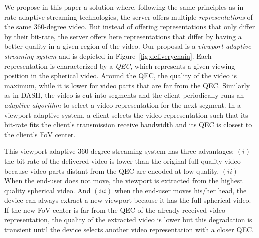 We propose in this paper a solution where, following the same principles as in
rate-adaptive streaming technologies, the server offers multiple \emph{representations}
of the same 360-degree video. But instead of offering representations that only differ by
their bit-rate, the server offers here representations that differ by
having a better quality in a given region of the video.
Our proposal is a \emph{viewport-adaptive streaming system} and is depicted in Figure~\ref{fig:deliverychain}.
Each representation is characterized by a \emph{\ac{QEC}}, which represents a given viewing
position in the spherical video. Around the \ac{QEC}, the quality of the video is maximum,
while it is lower for video parts that are far from the \ac{QEC}. Similarly as
in \ac{DASH}, the video is cut into segments and the client periodically runs
an \emph{adaptive algorithm} to select
a video representation for the next segment. In a viewport-adaptive system, a client selects
the video representation such that its bit-rate fits the client's transmission receive bandwidth and its
\ac{QEC} is closest to the client's \ac{FoV} center.



This viewport-adaptive 360-degree streaming system has three advantages:
$(i)$ the bit-rate of the delivered video is lower than the original full-quality video because video parts distant from the \ac{QEC} are encoded at low quality.
$(ii)$ When the end-user does not move, the viewport is extracted from the highest
quality spherical video.
And $(iii)$ when the end-user moves his/her head, the device can
always extract
a new viewport because it has the full spherical video. If the
new \ac{FoV} center is far from the
\ac{QEC} of the already received video representation, the quality of the extracted video is lower but this
degradation is transient until the
device selects another video representation with a closer \ac{QEC}.

